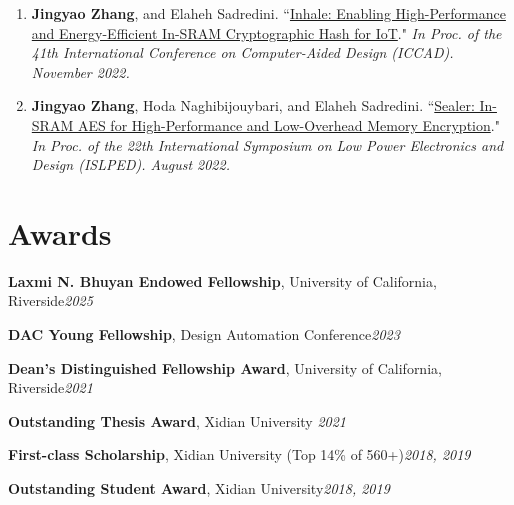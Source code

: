 \documentclass[letterpaper,11pt]{article}
\newcommand{\resumeSubHeadingListStart}{\begin{itemize}[leftmargin=0.15in, label={}]}
\newcommand{\resumeSubHeadingListEnd}{\end{itemize}}
\begin{document}
\begin{enumerate}[leftmargin=*, labelindent=12pt, label=\arabic*., topsep=0pt, partopsep=0pt, parsep=0pt, itemsep=3pt]
        \item \textbf{Jingyao Zhang}, and Elaheh Sadredini. ``\href{https://arxiv.org/pdf/2208.07570.pdf}{Inhale: Enabling High-Performance and Energy-Efficient In-SRAM Cryptographic Hash for IoT}." \textit{In Proc. of the 41th International Conference on Computer-Aided Design (ICCAD). November 2022.}
        
        \item \textbf{Jingyao Zhang}, Hoda Naghibijouybari, and Elaheh Sadredini. ``\href{https://arxiv.org/pdf/2207.01298.pdf}{Sealer: In-SRAM AES for High-Performance and Low-Overhead Memory Encryption}." \textit{In Proc. of the 22th International Symposium on Low Power Electronics and Design (ISLPED). August 2022.}
        
  \end{enumerate}

\section{Awards}
  \vspace{2pt}
  \resumeSubHeadingListStart
    \small{\item{
        \textbf{Laxmi N. Bhuyan Endowed Fellowship}, University of California, Riverside\hfill \textit{2025} \\ \vspace{3pt}
    
        \textbf{DAC Young Fellowship}, Design Automation Conference\hfill \textit{2023} \\ \vspace{3pt}
    
        \textbf{Dean’s Distinguished Fellowship Award}, University of California, Riverside\hfill \textit{2021} \\ \vspace{3pt}
        
        \textbf{Outstanding Thesis Award}, Xidian University \hfill \textit{2021} \\ \vspace{3pt}
        
        \textbf{First-class Scholarship}, Xidian University (Top 14\% of 560+)\hfill \textit{2018, 2019} \\ \vspace{3pt}
        
        \textbf{Outstanding Student Award}, Xidian University\hfill \textit{2018, 2019} \\ \vspace{3pt}
    }}
  \resumeSubHeadingListEnd
\end{document}

